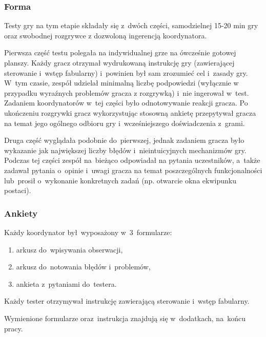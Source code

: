 \documentclass[licencjacka]{pracamgr}
\begin{document}
      \subsubsection{Forma}
      Testy gry na tym etapie składały się z~dwóch części, samodzielnej 15-20 min gry
      oraz swobodnej rozgrywce z dozwoloną ingerencją koordynatora.
      
      Pierwsza część testu polegała na indywidualnej grze na ówcześnie gotowej planszy.
      Każdy gracz otrzymał wydrukowaną instrukcję gry (zawierającej sterowanie i~wstęp fabularny)
      i~powinien był sam zrozumieć cel i~zasady gry. W~tym czasie, zespół udzielał minimalną liczbę
      podpowiedzi (wyłącznie w przypadku wyraźnych problemów gracza z rozgrywką) i~nie ingerował w~test.
      Zadaniem koordynatorów w~tej części było odnotowywanie reakcji gracza. 
      Po ukończeniu rozgrywki gracz wykorzystując stosowną ankietę przepytywał gracza na temat 
      jego ogólnego odbioru gry i~wcześniejszego doświadczenia z~grami. 
      
      Druga część wyglądała podobnie do~pierwszej, jednak zadaniem gracza było wykazanie 
      jak największej liczby błędów i~nieintuicyjnych mechanizmów gry. 
      Podczas tej części zespół na~bieżąco odpowiadał na pytania uczestników,
      a~także zadawał pytania o~opinie i~uwagi gracza na temat poszczególnych funkcjonalności
      lub~prosił o~wykonanie konkretnych zadań (np. otwarcie okna ekwipunku postaci).

      \subsubsection{Ankiety}
      Każdy koordynator był~wyposażony w~3~formularze:
      \begin{enumerate}
	\item arkusz do~wpisywania obserwacji,
	\item arkusz do~notowania błędów i~problemów,
	\item ankieta z~pytaniami do~testera.
      \end{enumerate}
      Każdy tester otrzymywał instrukcję zawierającą sterowanie i~wstęp fabularny.
      
      \noindent
      Wymienione formularze oraz~instrukcja znajdują się w~dodatkach, na~końcu pracy.
  
\end{document}
